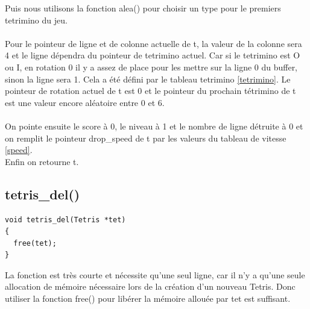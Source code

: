 \documentclass[a4paper,10p]{report}
\begin{document}
Puis nous utilisons la fonction alea() pour choisir un type pour le premiers tetrimino du jeu.
\\\\
Pour le pointeur de ligne et de colonne actuelle de t, la valeur de la colonne sera 4 et le ligne dépendra du pointeur de tetrimino actuel. Car si le tetrimino est O ou I, en rotation 0 il y a assez de place pour les mettre sur la ligne 0 du buffer, sinon la ligne sera 1. Cela a été défini par le tableau tetrimino \ref{tetrimino}. Le pointeur de rotation actuel de t est 0 et le pointeur du prochain tétrimino de t est une valeur encore aléatoire entre 0 et 6.
\\\\ On pointe ensuite le score à 0, le niveau à 1 et le nombre de ligne détruite à 0 et on remplit le pointeur drop\_speed de t par les valeurs du tableau de vitesse \ref{speed}.
\\Enfin on retourne t.

\subsection{tetris\_del()}
\label{tetris_del}

\begin{lstlisting}
void tetris_del(Tetris *tet)
{
  free(tet);
}
\end{lstlisting}
La fonction est très courte et nécessite qu'une seul ligne, car il n'y a qu'une seule allocation de mémoire nécessaire lors de la création d'un nouveau Tetris. Donc utiliser la fonction free() pour libérer la mémoire allouée par tet est suffisant.
\end{document}
